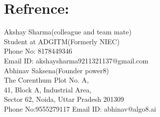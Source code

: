 \documentclass[10pt]{report}
\begin{document}
\section*{Refrence:}%
Akshay Sharma(colleague and team mate)\\
Student at ADGITM(Formerly NIEC)\\
Phone No: 8178449346\\
Email ID: akshaysharma9211321137@gmail.com \\[2pt]
 
\noindent Abhinav Saksena(Founder power8)\\
The Corenthum Plot No. A,\\
41, Block A, Industrial Area,\\
Sector 62, Noida, Uttar Pradesh 201309\\
Phone No:9555279117
Email ID: abhinav@algo8.ai
\end{document}
